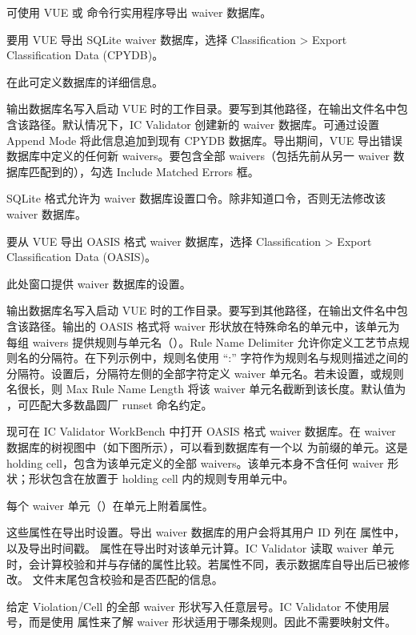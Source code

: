 可使用 VUE 或  命令行实用程序导出 waiver 数据库。

要用 VUE 导出 SQLite waiver 数据库，选择 Classification > Export Classification Data (CPYDB)。

在此可定义数据库的详细信息。

输出数据库名写入启动 VUE 时的工作目录。要写到其他路径，在输出文件名中包含该路径。默认情况下，IC Validator 创建新的 waiver 数据库。可通过设置 Append Mode 将此信息追加到现有 CPYDB 数据库。导出期间，VUE 导出错误数据库中定义的任何新 waivers。要包含全部 waivers（包括先前从另一 waiver 数据库匹配到的），勾选 Include Matched Errors 框。

SQLite 格式允许为 waiver 数据库设置口令。除非知道口令，否则无法修改该 waiver 数据库。

要从 VUE 导出 OASIS 格式 waiver 数据库，选择 Classification > Export Classification Data (OASIS)。

此处窗口提供 waiver 数据库的设置。

输出数据库名写入启动 VUE 时的工作目录。要写到其他路径，在输出文件名中包含该路径。输出的 OASIS 格式将 waiver 形状放在特殊命名的单元中，该单元为每组 waivers 提供规则与单元名（）。Rule Name Delimiter 允许你定义工艺节点规则名的分隔符。在下列示例中，规则名使用 ``:'' 字符作为规则名与规则描述之间的分隔符。设置后，分隔符左侧的全部字符定义 waiver 单元名。若未设置，或规则名很长，则 Max Rule Name Length 将该 waiver 单元名截断到该长度。默认值为 ，可匹配大多数晶圆厂 runset 命名约定。

现可在 IC Validator WorkBench 中打开 OASIS 格式 waiver 数据库。在 waiver 数据库的树视图中（如下图所示），可以看到数据库有一个以  为前缀的单元。这是 holding cell，包含为该单元定义的全部 waivers。该单元本身不含任何 waiver 形状；形状包含在放置于 holding cell 内的规则专用单元中。

每个 waiver 单元（）在单元上附着属性。

这些属性在导出时设置。导出 waiver 数据库的用户会将其用户 ID 列在  属性中，以及导出时间戳。 属性在导出时对该单元计算。IC Validator 读取 waiver 单元时，会计算校验和并与存储的属性比较。若属性不同，表示数据库自导出后已被修改。 文件末尾包含校验和是否匹配的信息。

给定 Violation/Cell 的全部 waiver 形状写入任意层号。IC Validator 不使用层号，而是使用  属性来了解 waiver 形状适用于哪条规则。因此不需要映射文件。


